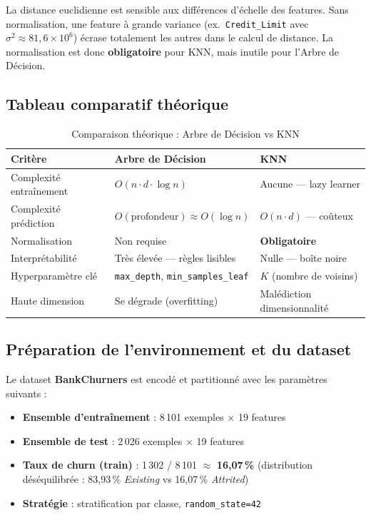 \documentclass[12pt,a4paper]{article}
\newcommand{\feature}[1]{\texttt{\small #1}}
\begin{document}
\begin{observbox}
La distance euclidienne est sensible aux différences d'échelle des features. Sans normalisation,
une feature à grande variance (ex.\ \feature{Credit\_Limit} avec $\sigma^2 \approx 81{,}6\times10^6$)
écrase totalement les autres dans le calcul de distance. La normalisation est donc \textbf{obligatoire}
pour KNN, mais inutile pour l'Arbre de Décision.
\end{observbox}

\subsection{Tableau comparatif théorique}

\begin{table}[H]
\centering
\caption{Comparaison théorique : Arbre de Décision vs KNN}
\begin{tabularx}{\linewidth}{lXX}
\toprule
\textbf{Critère} & \textbf{Arbre de Décision} & \textbf{KNN} \\
\midrule
Complexité entraînement & $O(n \cdot d \cdot \log n)$ & Aucune — lazy learner \\
\rowcolor{rowalt}
Complexité prédiction & $O(\text{profondeur}) \approx O(\log n)$ & $O(n \cdot d)$ — coûteux \\
Normalisation & Non requise & \textbf{Obligatoire} \\
\rowcolor{rowalt}
Interprétabilité & Très élevée — règles lisibles & Nulle — boîte noire \\
Hyperparamètre clé & \texttt{max\_depth}, \texttt{min\_samples\_leaf} & $K$ (nombre de voisins) \\
\rowcolor{rowalt}
Haute dimension & Se dégrade (overfitting) & Malédiction dimensionnalité \\
\bottomrule
\end{tabularx}
\end{table}

\subsection{Préparation de l'environnement et du dataset}

Le dataset \textbf{BankChurners} est encodé et partitionné avec les paramètres suivants :

\begin{resultbox}
\begin{itemize}[noitemsep]
  \item \textbf{Ensemble d'entraînement} : 8\,101 exemples $\times$ 19 features
  \item \textbf{Ensemble de test} : 2\,026 exemples $\times$ 19 features
  \item \textbf{Taux de churn (train)} : 1\,302 / 8\,101 $\approx$ \textbf{16,07\,\%}
    (distribution déséquilibrée : 83,93\,\% \emph{Existing} vs 16,07\,\% \emph{Attrited})
  \item \textbf{Stratégie} : stratification par classe, \texttt{random\_state=42}
\end{itemize}
\end{resultbox}
\end{document}
